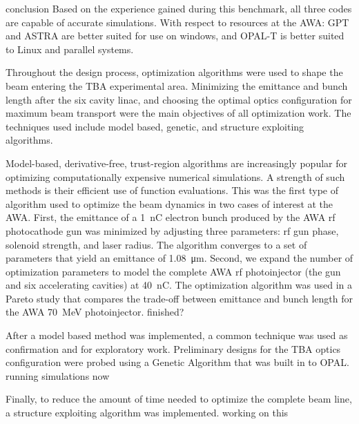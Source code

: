 \documentclass{iitthesis}
\newcommand{\nrnote}[1]{\textsf{{\color{blue}{ NN note:}   #1 }}}
\begin{document}
\nrnote{conclusion}
Based on the experience gained during this benchmark, 
all  three  codes  are  capable  of  accurate  simulations.  With  
respect  to  resources  at  the  AWA:  GPT  and  ASTRA  are  
better  suited  for  use  on  windows,  and  OPAL-T  is  better  
suited to Linux and parallel systems.

 \label{sec:opt}
Throughout the design process, optimization algorithms 
were used to shape the beam entering the TBA experimental area.
Minimizing the emittance and bunch length after the six cavity linac,
and choosing the optimal optics configuration for maximum beam transport 
were the main objectives of all optimization work.
The techniques used include model based, genetic,
and structure exploiting algorithms. 
 
Model-based, derivative-free, trust-region algorithms 
are increasingly popular for optimizing computationally 
expensive numerical simulations. A strength of such
methods is their efficient use of function evaluations. 
This was the first type of algorithm used to optimize 
the beam dynamics in two cases of interest at the AWA. 
First, the emittance of a \SI{1}{nC} electron 
bunch produced by the AWA rf photocathode gun 
was minimized by adjusting three parameters: rf gun phase, 
solenoid strength, and laser radius. The algorithm 
converges to a set of parameters that yield an
emittance of \SI{1.08}{\um}. Second, we expand 
the number of optimization parameters to model the complete AWA rf 
photoinjector (the gun and six accelerating cavities) at \SI{40}{nC}. 
The optimization algorithm was used in a Pareto study that compares the 
trade-off between emittance and bunch 
length for the AWA \SI{70}{MeV} photoinjector. \nrnote{finished?}

After a model based method was implemented, a common technique was 
used as confirmation and for exploratory work. Preliminary designs 
for the TBA optics configuration were probed using a Genetic Algorithm
that was built in to OPAL.  \nrnote{running simulations now}

Finally, to reduce the amount of time needed to optimize the complete beam line, 
a structure exploiting algorithm was implemented. \nrnote{working on this}
\end{document}
